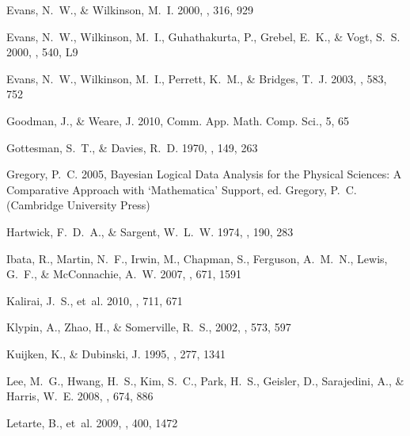 \documentclass[preprint,12pt]{aastex}
\begin{document}
\begin{thebibliography}{}
{Evans}, N.~W., \& {Wilkinson}, M.~I. 2000, \mnras, 316, 929

{Evans}, N.~W., {Wilkinson}, M.~I., {Guhathakurta}, P., {Grebel}, E.~K., \&
  {Vogt}, S.~S. 2000, \apjl, 540, L9

{Evans}, N.~W., {Wilkinson}, M.~I., {Perrett}, K.~M., \& {Bridges}, T.~J. 2003,
  \apj, 583, 752

Goodman, J., \& Weare, J. 2010, Comm. App. Math. Comp. Sci., 5, 65

{Gottesman}, S.~T., \& {Davies}, R.~D. 1970, \mnras, 149, 263

{Gregory}, P.~C. 2005, {Bayesian Logical Data Analysis for the Physical
  Sciences: A Comparative Approach with `Mathematica' Support}, ed. {Gregory,
  P.~C.} (Cambridge University Press)

{Hartwick}, F.~D.~A., \& {Sargent}, W.~L.~W. 1974, \apj, 190, 283

{Ibata}, R., {Martin}, N.~F., {Irwin}, M., {Chapman}, S., {Ferguson}, A.~M.~N.,
  {Lewis}, G.~F., \& {McConnachie}, A.~W. 2007, \apj, 671, 1591

{Kalirai}, J.~S., {et~al.} 2010, \apj, 711, 671

{Klypin}, A., {Zhao}, H., \& {Somerville}, R.~S.,
2002, \apj, 573, 597

{Kuijken}, K., \& {Dubinski}, J. 1995, \mnras, 277, 1341

{Lee}, M.~G., {Hwang}, H.~S., {Kim}, S.~C., {Park}, H.~S., {Geisler}, D.,
  {Sarajedini}, A., \& {Harris}, W.~E. 2008, \apj, 674, 886

{Letarte}, B., {et~al.} 2009, \mnras, 400, 1472


\end{thebibliography}
\end{document}
